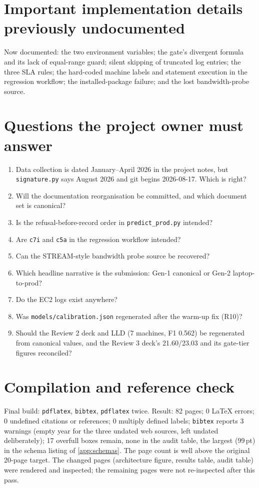 \section{Important implementation details previously undocumented}
Now documented: the two environment variables; the gate's divergent formula and its lack of equal-range guard; silent skipping of truncated log entries; the three SLA rules; the hard-coded machine labels and statement execution in the regression workflow; the installed-package failure; and the lost bandwidth-probe source.

\section{Questions the project owner must answer}
\begin{enumerate}
\item Data collection is dated January--April 2026 in the project notes, but \texttt{signature.py} says August 2026 and git begins 2026-08-17. Which is right?
\item Will the documentation reorganisation be committed, and which document set is canonical?
\item Is the refusal-before-record order in \texttt{predict\_prod.py} intended?
\item Are \texttt{c7i} and \texttt{c5a} in the regression workflow intended?
\item Can the STREAM-style bandwidth probe source be recovered?
\item Which headline narrative is the submission: Gen-1 canonical or Gen-2 laptop-to-prod?
\item Do the EC2 logs exist anywhere?
\item Was \texttt{models/calibration.json} regenerated after the warm-up fix (R10)?
\item Should the Review 2 deck and LLD (7 machines, F1 0.562) be regenerated from canonical values, and the Review 3 deck's 21.60/23.03 and its gate-tier figures reconciled?
\end{enumerate}

\section{Compilation and reference check}
Final build: \texttt{pdflatex}, \texttt{bibtex}, \texttt{pdflatex} twice. Result: 82 pages; 0 LaTeX errors; 0 undefined citations or references; 0 multiply defined labels; \texttt{bibtex} reports 3 warnings (empty year for the three undated web sources, left undated deliberately); 17 overfull boxes remain, none in the audit table, the largest (99\,pt) in the schema listing of \cref{app:schemas}. The page count is well above the original 20-page target. The changed pages (architecture figure, results table, audit table) were rendered and inspected; the remaining pages were not re-inspected after this pass.

